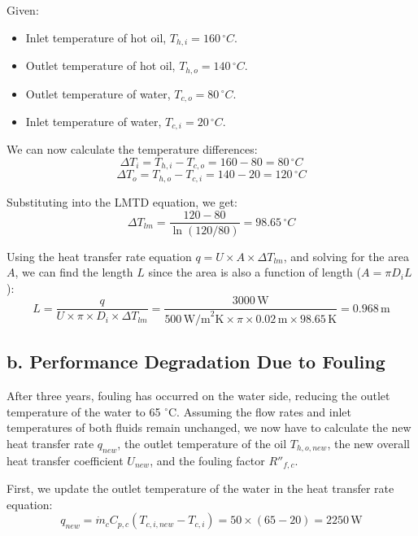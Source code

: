 \documentclass{article}
\numberwithin{equation}{section}
\begin{document}
Given:
\begin{itemize}
    \item Inlet temperature of hot oil, \( T_{h,i} = 160 \, ^{\circ}C \).
    \item Outlet temperature of hot oil, \( T_{h,o} = 140 \, ^{\circ}C \).
    \item Outlet temperature of water, \( T_{c,o} = 80 \, ^{\circ}C \).
    \item Inlet temperature of water, \( T_{c,i} = 20 \, ^{\circ}C \).
\end{itemize}

We can now calculate the temperature differences:
\begin{equation}
\Delta T_{i} = T_{h,i} - T_{c,o} = 160 - 80 = 80 \, ^{\circ}C
\end{equation}
\begin{equation}
\Delta T_{o} = T_{h,o} - T_{c,i} = 140 - 20 = 120 \, ^{\circ}C
\end{equation}

Substituting into the LMTD equation, we get:
\begin{equation}
\Delta T_{lm} = \frac{120 - 80}{\ln(120/80)} = 98.65 \, ^{\circ}C
\end{equation}

Using the heat transfer rate equation \( q = U \times A \times \Delta T_{lm} \), and solving for the area \( A \), we can find the length \( L \) since the area is also a function of length (\( A = \pi D_i L \)):
\begin{equation}
L = \frac{q}{U \times \pi \times D_{i} \times \Delta T_{lm}} = \frac{3000 \, \text{W}}{500 \, \text{W/m}^2 \text{K} \times \pi \times 0.02 \, \text{m} \times 98.65 \, \text{K}} = 0.968 \, \text{m}
\end{equation}

\subsection*{b. Performance Degradation Due to Fouling}

After three years, fouling has occurred on the water side, reducing the outlet temperature of the water to 65 \( ^{\circ}\)C. Assuming the flow rates and inlet temperatures of both fluids remain unchanged, we now have to calculate the new heat transfer rate \( q_{new} \), the outlet temperature of the oil \( T_{h,o,new} \), the new overall heat transfer coefficient \( U_{new} \), and the fouling factor \( R''_{f,c} \).

First, we update the outlet temperature of the water in the heat transfer rate equation:
\begin{equation}
q_{new} = \dot{m}_{c} C_{p,c} (T_{c,i,new} - T_{c,i}) = 50 \times (65 - 20) = 2250 \, \text{W}
\end{equation}
\end{document}
